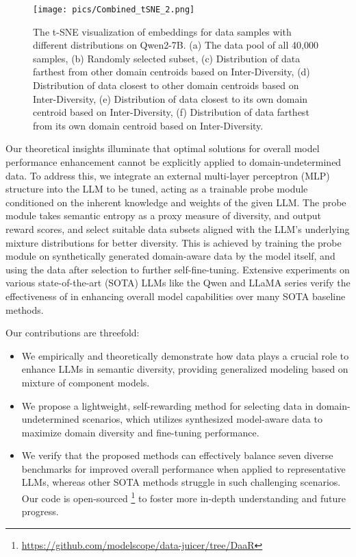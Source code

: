 \begin{figure*}[t!]
    \centering
\texttt{[image: pics/Combined\_tSNE\_2.png]}
    \caption{The t-SNE visualization of embeddings for data samples with different distributions on Qwen2-7B. (a) The data pool of all 40,000 samples, (b) Randomly selected subset, (c) Distribution of data farthest from other domain centroids based on Inter-Diversity, (d) Distribution of data closest to other domain centroids based on Inter-Diversity, (e) Distribution of data closest to its own domain centroid based on Inter-Diversity, (f) Distribution of data farthest from its own domain centroid based on Inter-Diversity.}
    \label{fig:tsne}
\end{figure*}

Our theoretical insights illuminate that optimal solutions for overall model performance enhancement cannot be explicitly applied to domain-undetermined data. To address this, we integrate an external multi-layer perceptron (MLP) structure into the LLM to be tuned, acting as a trainable probe module conditioned on the inherent knowledge and weights of the given LLM. 
The probe module takes semantic entropy as a proxy measure of diversity, and output reward scores, and select suitable data subsets aligned with the LLM's underlying mixture distributions for better diversity.
This is achieved by training the probe module on synthetically generated domain-aware data by the model itself, and using the data after selection to further self-fine-tuning.
Extensive experiments on various state-of-the-art (SOTA) LLMs like the Qwen and LLaMA series verify the effectiveness of \ours in enhancing overall model capabilities over many SOTA baseline methods.

Our contributions are threefold:
\begin{itemize}[leftmargin=*]
    \item We empirically and theoretically demonstrate how data plays a crucial role to enhance LLMs in semantic diversity, providing generalized modeling based on mixture of component models.
    \item We propose a lightweight, self-rewarding method for selecting data in domain-undetermined scenarios, which utilizes synthesized model-aware data to maximize domain diversity and fine-tuning performance. 
    \item We verify that the proposed methods can effectively balance seven diverse benchmarks for improved overall performance when applied to representative LLMs, whereas other SOTA methods struggle in such challenging scenarios. Our code is open-sourced \footnote{\href{https://github.com/modelscope/data-juicer/tree/DaaR}{https://github.com/modelscope/data-juicer/tree/DaaR}} to foster more in-depth understanding and future progress.
\end{itemize}
